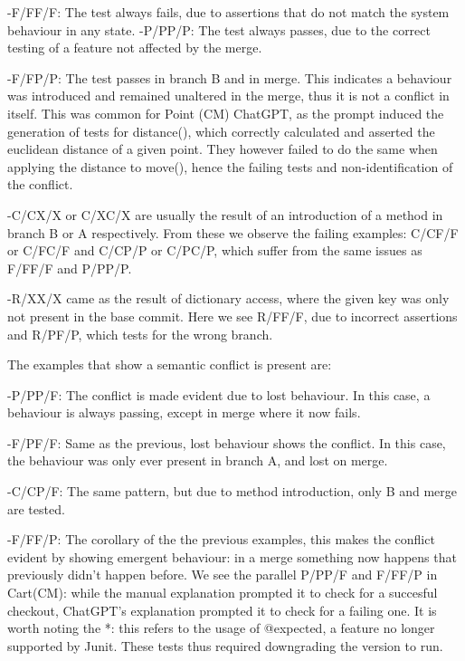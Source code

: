-F/FF/F: The test always fails, due to assertions that do not match the system behaviour in any state.
-P/PP/P: The test always passes, due to the correct testing of a feature not affected by the merge.

-F/FP/P: The test passes in branch B and in merge. This indicates a behaviour was introduced and remained unaltered in the merge, thus it is not a conflict in itself.
This was common for Point (CM) ChatGPT, as the prompt induced the generation of tests for distance(), which correctly calculated and asserted the euclidean distance of a given point.
They however failed to do the same when applying the distance to move(), hence the failing tests and non-identification of the conflict.

-C/CX/X or C/XC/X are usually the result of an introduction of a method in branch B or A respectively.
From these we observe the failing examples: C/CF/F or C/FC/F and C/CP/P or C/PC/P, which suffer from the same issues as F/FF/F and P/PP/P.

-R/XX/X came as the result of dictionary access, where the given key was only not present in the base commit.
Here we see R/FF/F, due to incorrect assertions and R/PF/P, which tests for the wrong branch.


The examples that show a semantic conflict is present are:

-P/PP/F: The conflict is made evident due to lost behaviour. In this case, a behaviour is always passing, except in merge where it now fails.

-F/PF/F: Same as the previous, lost behaviour shows the conflict. In this case, the behaviour was only ever present in branch A, and lost on merge.

-C/CP/F: The same pattern, but due to method introduction, only B and merge are tested.

-F/FF/P: The corollary of the the previous examples, this makes the conflict evident by showing emergent behaviour: in a merge something now happens that previously didn't happen before.
We see the parallel P/PP/F and F/FF/P in Cart(CM): while the manual explanation prompted it to check for a succesful checkout, ChatGPT's explanation prompted it to check for a failing one.
It is worth noting the *: this refers to the usage of @expected, a feature no longer supported by Junit. These tests thus required downgrading the version to run.


